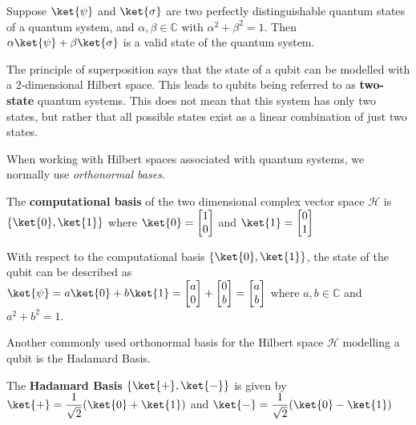 \begin{lemma}
Suppose $\ket{\psi}$ and $\ket{\sigma}$ are two perfectly distinguishable quantum states of a quantum system, and $\alpha, \beta \in \mathbb{C}$ with $\alpha^2 + \beta ^2 = 1$. Then $\alpha \ket{\psi} + \beta \ket{\sigma}$ is a valid state of the quantum system.
\end{lemma}

The principle of superposition says that the state of a qubit can be modelled with a $2$-dimensional Hilbert space. This leads to qubits being referred to as \textbf{two-state} quantum systems. This does not mean that this system has only two states, but rather that all possible states exist as a linear combination of just two states.

When working with Hilbert spaces associated with quantum systems, we normally use \textit{orthonormal bases}. 
\begin{defn}
The \textbf{computational basis} of the two dimensional complex vector space $\mathcal{H}$ is $\{ \ket{0}, \ket{1} \}$ where $\ket{0} = \begin{bmatrix} 1 \\ 0 \end{bmatrix}$ and $\ket{1} = \begin{bmatrix} 0 \\ 1 \end{bmatrix}$
\end{defn}

With respect to the computational basis $\{ \ket{0}, \ket{1} \}$, the state of the qubit can be described as \\ $\ket{\psi} = a \ket{0} + b \ket{1} = \begin{bmatrix} a \\ 0 \end{bmatrix} + \begin{bmatrix} 0 \\ b \end{bmatrix} = \begin{bmatrix} a \\ b \end{bmatrix} $ where $a, b \in \mathbb{C}$ and $a^2 + b^2 = 1$.

Another commonly used orthonormal basis for the Hilbert space $\mathcal{H}$ modelling a qubit is the Hadamard Basis.
\begin{defn}
The \textbf{Hadamard Basis} $\{ \ket{+}, \ket{-} \}$ is given by \\
$\ket{+} = \displaystyle\frac{1}{\sqrt 2} (\ket{0} + \ket{1})$ and $\ket{-} = \displaystyle\frac{1}{\sqrt 2} (\ket{0} - \ket{1})$
\end{defn}

